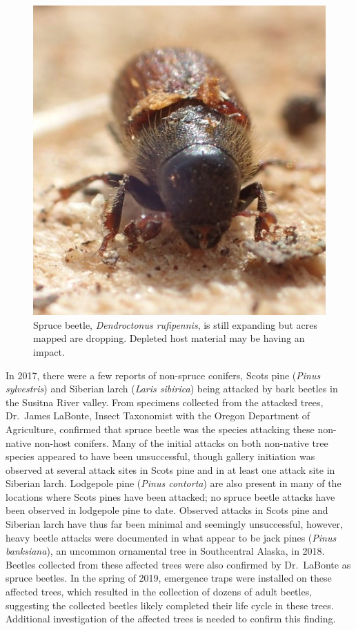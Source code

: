 \begin{figure}[H]
\begin{center}
\vspace{2mm}
\includegraphics[width=\textwidth]{img/spruce_beetle.jpg}
\caption{Spruce beetle, \textit{Dendroctonus rufipennis}, is still expanding but acres mapped are dropping. Depleted host material may be having an impact.}
\label{spruce_beetle}
\end{center}
\end{figure} 

In 2017, there were a few reports of non-spruce conifers, Scots pine (\textit{Pinus sylvestris}) and Siberian larch (\textit{Laris sibirica}) being attacked by bark beetles in the Susitna River valley. From specimens collected from the attacked trees, Dr.\ James LaBonte, Insect Taxonomist with the Oregon Department of Agriculture, confirmed that spruce beetle was the species attacking these non-native non-host conifers. Many of the initial attacks on both non-native tree species appeared to have been unsuccessful, though gallery initiation was observed at several attack sites in Scots pine and in at least one attack site in Siberian larch. Lodgepole pine (\textit{Pinus contorta}) are also present in many of the locations where Scots pines have been attacked; no spruce beetle attacks have been observed in lodgepole pine to date. Observed attacks in Scots pine and Siberian larch have thus far been minimal and seemingly unsuccessful, however, heavy beetle attacks were documented in what appear to be jack pines (\textit{Pinus banksiana}), an uncommon ornamental tree in Southcentral Alaska, in 2018. Beetles collected from these affected trees were also confirmed by Dr.\ LaBonte as spruce beetles. In the spring of 2019, emergence traps were installed on these affected trees, which resulted in the collection of dozens of adult beetles, suggesting the collected beetles likely completed their life cycle in these trees. Additional investigation of the affected trees is needed to confirm this finding. 

